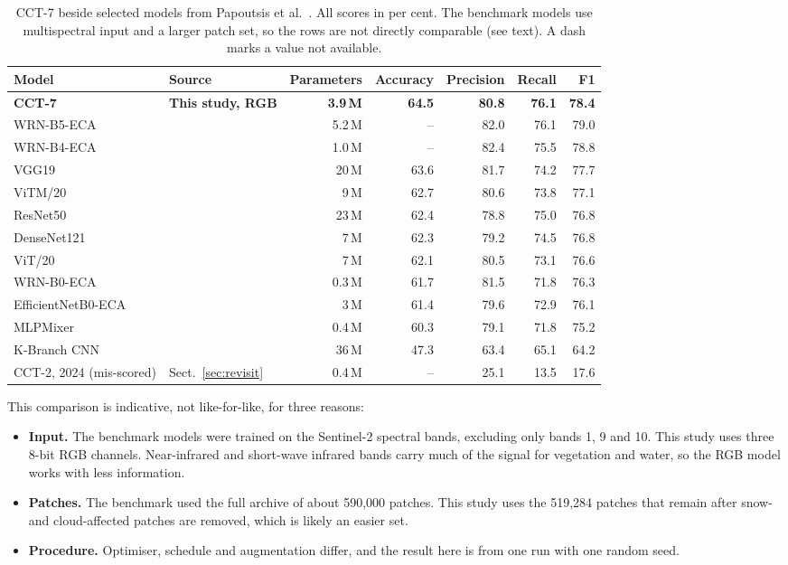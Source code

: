\documentclass[11pt]{article}
\begin{document}
\begin{table}[!htbp]
\centering
\caption{CCT-7 beside selected models from Papoutsis et al.~\cite{papoutsis}. All scores in per cent.
The benchmark models use multispectral input and a larger patch set, so the rows are not directly
comparable (see text). A dash marks a value not available.}
\label{tab:compare}
\small
\begin{tabular}{@{}llrrrrr@{}}
\toprule
Model & Source & Parameters & Accuracy & Precision & Recall & F1 \\
\midrule
\textbf{CCT-7} & \textbf{This study, RGB} & \textbf{3.9\,M} & \textbf{64.5} & \textbf{80.8} & \textbf{76.1} & \textbf{78.4} \\
\midrule
WRN-B5-ECA    & \cite{papoutsis} & 5.2\,M  & --   & 82.0 & 76.1 & 79.0 \\
WRN-B4-ECA    & \cite{papoutsis} & 1.0\,M  & --   & 82.4 & 75.5 & 78.8 \\
VGG19         & \cite{papoutsis} & 20\,M   & 63.6 & 81.7 & 74.2 & 77.7 \\
ViTM/20       & \cite{papoutsis} & 9\,M    & 62.7 & 80.6 & 73.8 & 77.1 \\
ResNet50      & \cite{papoutsis} & 23\,M   & 62.4 & 78.8 & 75.0 & 76.8 \\
DenseNet121   & \cite{papoutsis} & 7\,M    & 62.3 & 79.2 & 74.5 & 76.8 \\
ViT/20        & \cite{papoutsis} & 7\,M    & 62.1 & 80.5 & 73.1 & 76.6 \\
WRN-B0-ECA    & \cite{papoutsis} & 0.3\,M  & 61.7 & 81.5 & 71.8 & 76.3 \\
EfficientNetB0-ECA & \cite{papoutsis} & 3\,M & 61.4 & 79.6 & 72.9 & 76.1 \\
MLPMixer      & \cite{papoutsis} & 0.4\,M  & 60.3 & 79.1 & 71.8 & 75.2 \\
K-Branch CNN  & \cite{papoutsis} & 36\,M   & 47.3 & 63.4 & 65.1 & 64.2 \\
\midrule
CCT-2, 2024 (mis-scored) & Sect.~\ref{sec:revisit} & 0.4\,M & -- & 25.1 & 13.5 & 17.6 \\
\bottomrule
\end{tabular}
\end{table}

This comparison is indicative, not like-for-like, for three reasons:

\begin{itemize}
  \item \textbf{Input.} The benchmark models were trained on the Sentinel-2 spectral bands, excluding
        only bands 1, 9 and 10. This study uses three 8-bit RGB channels. Near-infrared and short-wave
        infrared bands carry much of the signal for vegetation and water, so the RGB model works with
        less information.
  \item \textbf{Patches.} The benchmark used the full archive of about 590,000 patches. This study uses
        the 519,284 patches that remain after snow- and cloud-affected patches are removed, which is
        likely an easier set.
  \item \textbf{Procedure.} Optimiser, schedule and augmentation differ, and the result here is from one
        run with one random seed.
\end{itemize}
\end{document}
